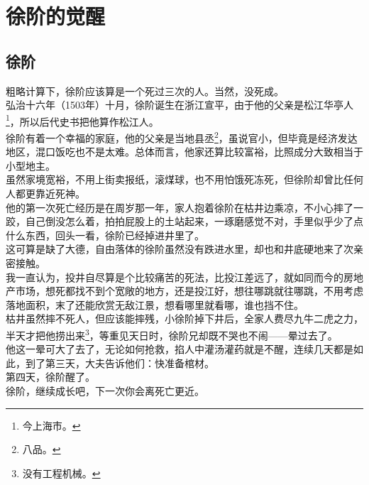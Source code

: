 \section{徐阶的觉醒}
\ifnum{}
	\begin{multicols}{\theparacolNo}
\fi
\subsection{徐阶}
粗略计算下，徐阶应该算是一个死过三次的人。当然，没死成。\\

弘治十六年（1503年）十月，徐阶诞生在浙江宣平，由于他的父亲是松江华亭人\footnote{今上海市。}，所以后代史书把他算作松江人。\\

徐阶有着一个幸福的家庭，他的父亲是当地县丞\footnote{八品。}，虽说官小，但毕竟是经济发达地区，混口饭吃也不是太难。总体而言，他家还算比较富裕，比照成分大致相当于小型地主。\\

虽然家境宽裕，不用上街卖报纸，滚煤球，也不用怕饿死冻死，但徐阶却曾比任何人都更靠近死神。\\

他的第一次死亡经历是在周岁那一年，家人抱着徐阶在枯井边乘凉，不小心摔了一跤，自己倒没怎么着，拍拍屁股上的土站起来，一琢磨感觉不对，手里似乎少了点什么东西，回头一看，徐阶已经掉进井里了。\\

这可算是缺了大德，自由落体的徐阶虽然没有跌进水里，却也和井底硬地来了次亲密接触。\\

我一直认为，投井自尽算是个比较痛苦的死法，比投江差远了，就如同而今的房地产市场，想死都找不到个宽敞的地方，还是投江好，想往哪跳就往哪跳，不用考虑落地面积，末了还能欣赏无敌江景，想看哪里就看哪，谁也挡不住。\\

枯井虽然摔不死人，但应该能摔残，小徐阶掉下井后，全家人费尽九牛二虎之力，半天才把他捞出来\footnote{没有工程机械。}，等重见天日时，徐阶兄却既不哭也不闹——晕过去了。\\

他这一晕可大了去了，无论如何抢救，掐人中灌汤灌药就是不醒，连续几天都是如此，到了第三天，大夫告诉他们：快准备棺材。\\

第四天，徐阶醒了。\\

徐阶，继续成长吧，下一次你会离死亡更近。\\


\end{multicols}

